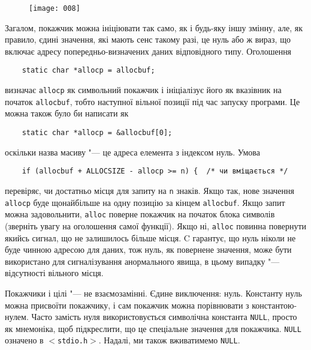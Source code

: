 \documentclass[a4paper,12pt]{book}
\begin{document}
  \begin{figure}[h]
  \centering
  \texttt{[image: 008]}
  \end{figure}

  Загалом, покажчик можна ініціювати так само, як і будь-яку іншу змінну, але, як
  правило, єдині значення, які мають сенс такому разі, це нуль або ж вираз, що включає
  адресу попередньо-визначених даних відповідного типу. Оголошення
  \begin{verbatim}
    static char *allocp = allocbuf;
  \end{verbatim}
  визначає \texttt{allocp} як символьний покажчик і ініціалізує його як вказівник на
  початок \texttt{allocbuf}, тобто наступної вільної позиції під час запуску програми. Це
  можна також було би написати як
  \begin{verbatim}
    static char *allocp = &allocbuf[0];
  \end{verbatim}
  оскільки назва масиву "--- це адреса елемента з індексом нуль. Умова
  \begin{verbatim}
    if (allocbuf + ALLOCSIZE - allocp >= n) {  /* чи вміщається */
  \end{verbatim}
  перевіряє, чи достатньо місця для запиту на \texttt{n} знаків. Якщо так, нове значення
  \texttt{allocp} буде щонайбільше на одну позицію за кінцем \texttt{allocbuf}. Якщо запит
  можна задовольнити, \texttt{alloc} поверне покажчик на початок блока символів (зверніть
  увагу на оголошення самої функції). Якщо ні, \texttt{alloc} повинна повернути якийсь
  сигнал, що не залишилось більше місця. C гарантує, що нуль ніколи не буде чинною адресою
  для даних, тож нуль, як повернене значення, може бути використано для сигналізування
  анормального явища, в цьому випадку "--- відсутності вільного місця.

  Покажчики і цілі "--- не взаємозамінні. Єдине виключення: нуль. Константу
  нуль можна присвоїти покажчику, і сам покажчик можна порівнювати з константою-нулем.
  Часто замість нуля використовується символічна константа \texttt{NULL}, просто як
  мнемоніка, щоб підкреслити, що це спеціальне значення для покажчика. \texttt{NULL}
  означено в \texttt{\mbox{$<$}stdio.h\mbox{$>$}}. Надалі, ми також вживатимемо \texttt{NULL}.
\end{document}
